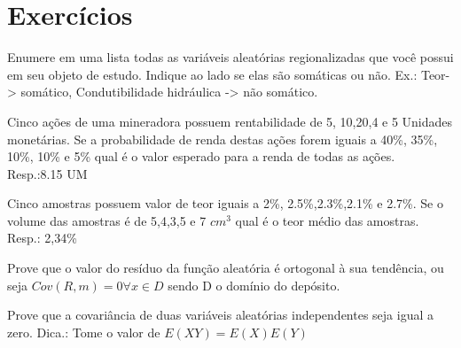 \section{Exercícios}

\begin{exercise}
	Enumere em uma lista todas as variáveis aleatórias regionalizadas que você possui em seu objeto de estudo. Indique ao lado se elas são somáticas ou não. Ex.: Teor-> somático, Condutibilidade hidráulica -> não somático.
\end{exercise}

\begin{exercise}	
 Cinco ações de uma mineradora possuem rentabilidade de 5, 10,20,4 e 5 Unidades monetárias. Se a probabilidade de renda destas ações forem iguais a 40\%, 35\%, 10\%, 10\% e 5\% qual é o valor esperado para a renda de todas as ações. Resp.:8.15 UM
\end{exercise}

\begin{exercise}
	Cinco amostras possuem valor de teor iguais a 2\%, 2.5\%,2.3\%,2.1\% e 2.7\%. Se o volume das amostras é de 5,4,3,5 e 7 $cm^3$ qual é o teor médio das amostras. Resp.: 2,34\%
\end{exercise}
\begin{exercise}	
	\item Prove que o valor do resíduo da função aleatória é ortogonal à sua tendência, ou seja $Cov(R,m) = 0 \forall x \in D$ sendo D o domínio do depósito.
\end{exercise}
\begin{exercise}
	\item Prove que a covariância de duas variáveis aleatórias independentes seja igual a zero. Dica.: Tome o valor de $E(XY) = E(X)E(Y)$
	
\end{exercise}

 